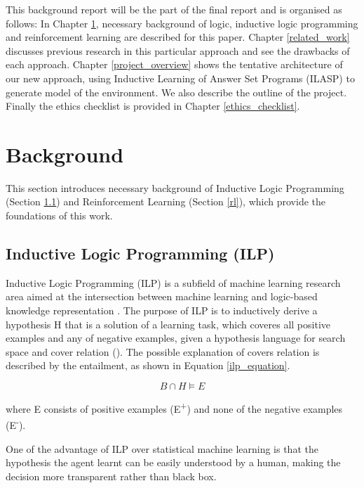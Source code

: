 \documentclass[12pt,twoside]{report}
\begin{document}
This background report will be the part of the final report and is organised as follows: In Chapter \ref{background}, necessary background of logic, inductive logic programming and reinforcement learning are described for this paper. Chapter \ref{related_work} discusses previous research in this particular approach and see the drawbacks of each approach. Chapter \ref{project_overview} shows the tentative architecture of our new approach, using Inductive Learning of Answer Set Programs (ILASP) to generate model of the environment. We also describe the outline of the project. Finally the ethics checklist is provided in Chapter \ref{ethics_checklist}.

\chapter{Background}
\label{background}

This section introduces necessary background of Inductive Logic Programming (Section \ref{ilp}) and Reinforcement Learning (Section \ref{rl}), which provide the foundations of this work.

\section{Inductive Logic Programming (ILP)}
\label{ilp}

Inductive Logic Programming (ILP) is a subfield of machine learning research area aimed at the intersection between machine learning and logic-based knowledge representation \cite{Muggleton1991}. The purpose of ILP is to inductively derive a hypothesis H that is a solution of a learning task, which coveres all positive examples and any of negative examples, given a hypothesis language for search space and cover relation (\cite{DeRaedt1997}). The possible explanation of covers relation is described by the entailment, as shown in Equation \ref{ilp_equation}.

\begin{equation}
B \cap H \models E
\end{equation}
\label{ilp_equation}

where E consists of positive examples (E\textsuperscript{+}) and none of the negative examples (E\textsuperscript{-}).

One of the advantage of ILP over statistical machine learning is that the hypothesis the agent learnt can be easily understood by a human, making the decision more transparent rather than black box.
\end{document}
